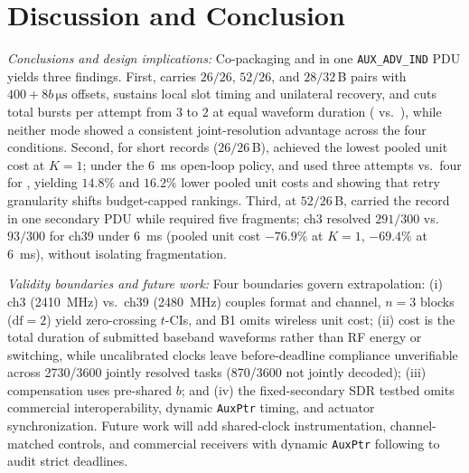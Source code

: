 \section{Discussion and Conclusion}\label{sec:conclusion}

\emph{Conclusions and design implications:} Co-packaging \ble{} and \stdfour{} in one \texttt{AUX\_ADV\_IND} PDU yields three findings. First, \proto{} carries $26/26$, $52/26$, and $28/32$\,B pairs with $400{+}8b\,\si{\micro\second}$ offsets, sustains local slot timing and unilateral recovery, and cuts total bursts per attempt from $3$ to $2$ at equal waveform duration (\modejc{} vs.\ \modesc{}), while neither mode showed a consistent joint-resolution advantage across the four conditions. Second, for short records ($26/26$\,B), \modelc{} achieved the lowest pooled unit cost at $K{=}1$; under the \SI{6}{ms} open-loop policy, \modejc{} and \modesc{} used three attempts vs.\ four for \modelc{}, yielding $14.8\%$ and $16.2\%$ lower pooled unit costs and showing that retry granularity shifts budget-capped rankings. Third, at $52/26$\,B, \modejc{} carried the \ble{} record in one secondary PDU while \modelc{} required five fragments; ch3 \modejc{} resolved $291/300$ vs.\ $93/300$ for ch39 \modelc{} under \SI{6}{ms} (pooled unit cost $-76.9\%$ at $K{=}1$, $-69.4\%$ at \SI{6}{ms}), without isolating fragmentation.

\emph{Validity boundaries and future work:} Four boundaries govern extrapolation: (i) ch3 \modejc{} (\SI{2410}{MHz}) vs.\ ch39 \modelc{} (\SI{2480}{MHz}) couples format and channel, $n{=}3$ blocks ($\text{df}{=}2$) yield zero-crossing $t$-CIs, and B1 omits wireless unit cost; (ii) cost is the total duration of submitted baseband waveforms rather than RF energy or switching, while uncalibrated clocks leave before-deadline compliance unverifiable across \num{2730}/\num{3600} jointly resolved tasks (\num{870}/\num{3600} not jointly decoded); (iii) \stdfour{} compensation uses pre-shared $b$; and (iv) the fixed-secondary SDR testbed omits commercial interoperability, dynamic \texttt{AuxPtr} timing, and actuator synchronization. Future work will add shared-clock instrumentation, channel-matched controls, and commercial receivers with dynamic \texttt{AuxPtr} following to audit strict deadlines.

